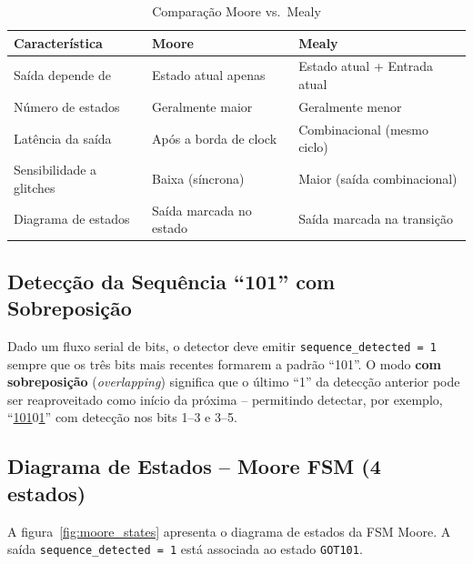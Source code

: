 \documentclass[12pt,a4paper]{article}
\begin{document}
\begin{table}[H]
  \centering
  \caption{Comparação Moore vs.\ Mealy}
  \label{tab:moore_vs_mealy}
  \begin{tabular}{lll}
    \toprule
    \textbf{Característica} & \textbf{Moore} & \textbf{Mealy} \\
    \midrule
    Saída depende de        & Estado atual apenas & Estado atual + Entrada atual \\
    Número de estados       & Geralmente maior    & Geralmente menor \\
    Latência da saída       & Após a borda de clock & Combinacional (mesmo ciclo) \\
    Sensibilidade a glitches & Baixa (síncrona) & Maior (saída combinacional) \\
    Diagrama de estados     & Saída marcada no estado & Saída marcada na transição \\
    \bottomrule
  \end{tabular}
\end{table}

\subsection{Detecção da Sequência ``101'' com Sobreposição}

Dado um fluxo serial de bits, o detector deve emitir \texttt{sequence\_detected = 1}
sempre que os três bits mais recentes formarem a padrão ``101''. O modo
\textbf{com sobreposição} (\textit{overlapping}) significa que o último ``1'' da
detecção anterior pode ser reaproveitado como início da próxima -- permitindo detectar,
por exemplo, ``\underline{101}0\underline{1}'' com detecção nos bits 1--3 e 3--5.

\subsection{Diagrama de Estados -- Moore FSM (4 estados)}

A figura~\ref{fig:moore_states} apresenta o diagrama de estados da FSM Moore.
A saída \texttt{sequence\_detected = 1} está associada ao estado \texttt{GOT101}.
\end{document}
